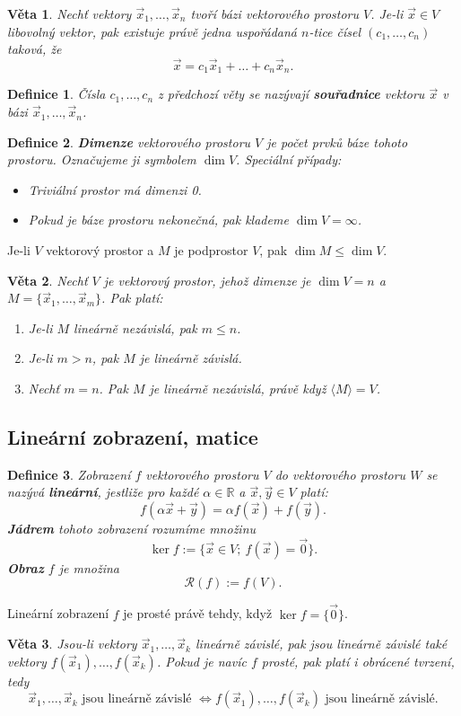 \documentclass{article}
\newtheorem{df}{Definice}
\newtheorem{veta}{Věta}
\newcommand{\0}{\vec{0}}
\newcommand{\lo}[1]{\langle #1\rangle}
\newcommand{\R}{\mathbb R}
\newcommand{\range}[1]{\mathcal R(#1)}
\newcommand{\xx}{\vec{x}}
\newcommand{\yy}{\vec{y}}
\begin{document}
\begin{veta}
Nechť vektory $\xx_1,\ldots,\xx_n$ tvoří bázi vektorového prostoru $V$.
Je-li $\xx\in V$ libovolný vektor, pak existuje právě jedna uspořádaná $n$-tice čísel $(c_1,\ldots,c_n)$ taková, že
$$ \xx = c_1\xx_1+\ldots+c_n\xx_n. $$
\end{veta}

\begin{df}
Čísla $c_1,\ldots,c_n$ z předchozí věty se nazývají {\bf souřadnice} vektoru $\xx$ v bázi $\xx_1,\ldots,\xx_n$.
\end{df}

\begin{df}
{\bf Dimenze} vektorového prostoru $V$ je počet prvků báze tohoto prostoru.
Označujeme ji symbolem $\dim V$.
Speciální případy:
\begin{itemize}
\item Triviální prostor má dimenzi 0.
\item Pokud je báze prostoru nekonečná, pak klademe $\dim V=\infty$.
\end{itemize}
\end{df}
% 
Je-li $V$ vektorový prostor a $M$ je podprostor $V$, pak $\dim M \le\dim V$.

\begin{veta}
Nechť $V$ je vektorový prostor, jehož dimenze je $\dim V=n$ a $M=\{\xx_1,\ldots,\xx_m\}$.
Pak platí:
\begin{enumerate}
\item Je-li $M$ lineárně nezávislá, pak $m\le n$.
\item Je-li $m>n$, pak $M$ je lineárně závislá.
\item Nechť $m=n$. Pak $M$ je lineárně nezávislá, právě když $\lo M=V$.
\end{enumerate}
\end{veta}



\subsection{Lineární zobrazení, matice}

\begin{df}
Zobrazení $f$ vektorového prostoru $V$ do vektorového prostoru $W$ se nazývá {\bf lineární}, jestliže pro každé $\alpha\in\R$ a $\xx,\yy\in V$ platí:
$$ f(\alpha\xx+\yy)=\alpha f(\xx) + f(\yy). $$
{\bf Jádrem} tohoto zobrazení rozumíme množinu
$$ \ker f:=\{\xx\in V;~f(\xx)=\0\}. $$
{\bf Obraz} $f$ je množina
$$ \range f :=f(V). $$
\end{df}
Lineární zobrazení $f$ je prosté právě tehdy, když $\ker f=\{\0\}$.
\begin{veta}
Jsou-li vektory $\xx_1,\ldots,\xx_k$ lineárně závislé, pak jsou lineárně závislé také vektory $f(\xx_1),\ldots,f(\xx_k)$.
Pokud je navíc $f$ prosté, pak platí i obrácené tvrzení, tedy
$$ \xx_1,\ldots,\xx_k \mbox{ jsou lineárně závislé }\Leftrightarrow f(\xx_1),\ldots,f(\xx_k)\mbox{ jsou lineárně závislé}. $$
\end{veta}
\end{document}
